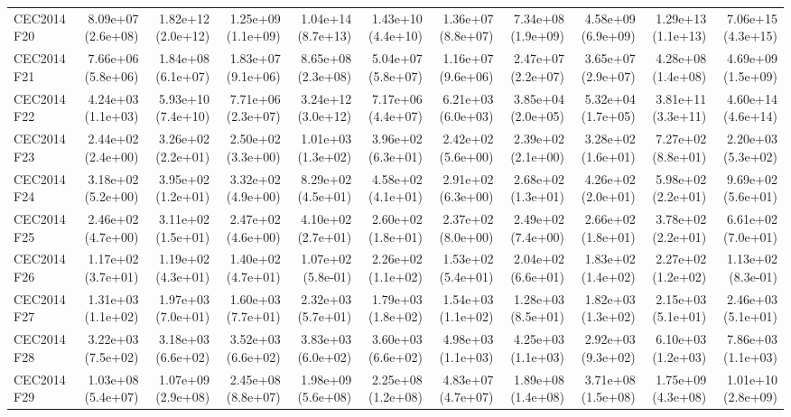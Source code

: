 \begin{longtable}{lrrrrrrrrrr}
CEC2014 F20 & 8.09e+07 (2.6e+08) & 1.82e+12 (2.0e+12) & 1.25e+09 (1.1e+09) & 1.04e+14 (8.7e+13) & 1.43e+10 (4.4e+10) & 1.36e+07 (8.8e+07) & 7.34e+08 (1.9e+09) & 4.58e+09 (6.9e+09) & 1.29e+13 (1.1e+13) & 7.06e+15 (4.3e+15) \\
CEC2014 F21 & 7.66e+06 (5.8e+06) & 1.84e+08 (6.1e+07) & 1.83e+07 (9.1e+06) & 8.65e+08 (2.3e+08) & 5.04e+07 (5.8e+07) & 1.16e+07 (9.6e+06) & 2.47e+07 (2.2e+07) & 3.65e+07 (2.9e+07) & 4.28e+08 (1.4e+08) & 4.69e+09 (1.5e+09) \\
CEC2014 F22 & 4.24e+03 (1.1e+03) & 5.93e+10 (7.4e+10) & 7.71e+06 (2.3e+07) & 3.24e+12 (3.0e+12) & 7.17e+06 (4.4e+07) & 6.21e+03 (6.0e+03) & 3.85e+04 (2.0e+05) & 5.32e+04 (1.7e+05) & 3.81e+11 (3.3e+11) & 4.60e+14 (4.6e+14) \\
CEC2014 F23 & 2.44e+02 (2.4e+00) & 3.26e+02 (2.2e+01) & 2.50e+02 (3.3e+00) & 1.01e+03 (1.3e+02) & 3.96e+02 (6.3e+01) & 2.42e+02 (5.6e+00) & 2.39e+02 (2.1e+00) & 3.28e+02 (1.6e+01) & 7.27e+02 (8.8e+01) & 2.20e+03 (5.3e+02) \\
CEC2014 F24 & 3.18e+02 (5.2e+00) & 3.95e+02 (1.2e+01) & 3.32e+02 (4.9e+00) & 8.29e+02 (4.5e+01) & 4.58e+02 (4.1e+01) & 2.91e+02 (6.3e+00) & 2.68e+02 (1.3e+01) & 4.26e+02 (2.0e+01) & 5.98e+02 (2.2e+01) & 9.69e+02 (5.6e+01) \\
CEC2014 F25 & 2.46e+02 (4.7e+00) & 3.11e+02 (1.5e+01) & 2.47e+02 (4.6e+00) & 4.10e+02 (2.7e+01) & 2.60e+02 (1.8e+01) & 2.37e+02 (8.0e+00) & 2.49e+02 (7.4e+00) & 2.66e+02 (1.8e+01) & 3.78e+02 (2.2e+01) & 6.61e+02 (7.0e+01) \\
CEC2014 F26 & 1.17e+02 (3.7e+01) & 1.19e+02 (4.3e+01) & 1.40e+02 (4.7e+01) & 1.07e+02 (5.8e-01) & 2.26e+02 (1.1e+02) & 1.53e+02 (5.4e+01) & 2.04e+02 (6.6e+01) & 1.83e+02 (1.4e+02) & 2.27e+02 (1.2e+02) & 1.13e+02 (8.3e-01) \\
CEC2014 F27 & 1.31e+03 (1.1e+02) & 1.97e+03 (7.0e+01) & 1.60e+03 (7.7e+01) & 2.32e+03 (5.7e+01) & 1.79e+03 (1.8e+02) & 1.54e+03 (1.1e+02) & 1.28e+03 (8.5e+01) & 1.82e+03 (1.3e+02) & 2.15e+03 (5.1e+01) & 2.46e+03 (5.1e+01) \\
CEC2014 F28 & 3.22e+03 (7.5e+02) & 3.18e+03 (6.6e+02) & 3.52e+03 (6.6e+02) & 3.83e+03 (6.0e+02) & 3.60e+03 (6.6e+02) & 4.98e+03 (1.1e+03) & 4.25e+03 (1.1e+03) & 2.92e+03 (9.3e+02) & 6.10e+03 (1.2e+03) & 7.86e+03 (1.1e+03) \\
CEC2014 F29 & 1.03e+08 (5.4e+07) & 1.07e+09 (2.9e+08) & 2.45e+08 (8.8e+07) & 1.98e+09 (5.6e+08) & 2.25e+08 (1.2e+08) & 4.83e+07 (4.7e+07) & 1.89e+08 (1.4e+08) & 3.71e+08 (1.5e+08) & 1.75e+09 (4.3e+08) & 1.01e+10 (2.8e+09) \\

\end{longtable}
